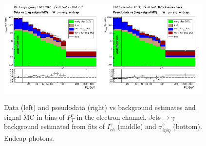 \begin{figure}[htb]
\begin{center}
   \includegraphics[width=0.48\textwidth]{../figs/figs_v11/ELECTRON_WGamma/PrepareYields/c_DATAvsBkgPlusSigMCc_ELECTRON_WGamma_TEMPL_SIHIH_UNblind__Endcap__phoEt.png}\includegraphics[width=0.48\textwidth]{../figs/figs_v11/ELECTRON_WGamma/PrepareYields/c_DATAvsBkgPlusSigMCc_ELECTRON_WGamma_TEMPL_SIHIH_UNblind_MCclosure__Endcap__phoEt_MCclosure.png}
  \caption{Data (left) and pseudodata (right) vs background estimates and signal MC in bins of $P_T^{\gamma}$ in the electron channel. Jets$\rightarrow\gamma$ background estimated from fits of $I_{ch}^{\gamma}$ (middle) and  $\sigma_{i\eta i\eta}^{\gamma}$ (bottom). Endcap photons.}
  \label{fig:DATAvsBKGandSIGMC_MCclosure_ELECTRON_E}
  \end{center}
\end{figure}

